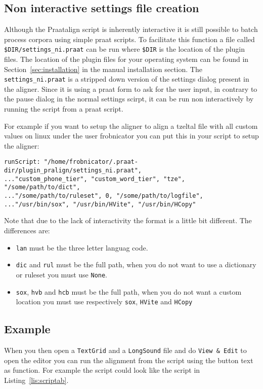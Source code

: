 \subsection{Non interactive settings file creation}
Although the Praatalign script is inherently interactive it is still possible
to batch process corpora using simple praat scripts. To facilitate this
function a file called \texttt{\$DIR/settings\_ni.praat} can be run where
\texttt{\$DIR} is the location of the plugin files. The location of the plugin
files for your operating system can be found in Section~\ref{sec:installation}
in the manual installation section. The \texttt{settings\_ni.praat} is a
stripped down version of the settings dialog present in the aligner. Since it
is using a praat form to ask for the user input, in contrary to the pause
dialog in the normal settings scirpt, it can be run non interactively by
running the script from a praat script.

For example if you want to setup the aligner to align a tzeltal file with all
custom values on linux under the user frobnicator you can put this in your
script to setup the aligner:

\begin{lstlisting}
runScript: "/home/frobnicator/.praat-dir/plugin_pralign/settings_ni.praat",
..."custom_phone_tier", "custom_word_tier", "tze", "/some/path/to/dict",
..."/some/path/to/ruleset", 0, "/some/path/to/logfile",
..."/usr/bin/sox", "/usr/bin/HVite", "/usr/bin/HCopy"
\end{lstlisting}

Note that due to the lack of interactivity the format is a little bit
different. The differences are:
\begin{itemize}
	\item \texttt{lan} must be the three letter languag code.
	\item \texttt{dic} and \texttt{rul} must be the full path, when you do not
want to use a dictionary or ruleset you must use \texttt{None}.
	\item \texttt{sox}, \texttt{hvb} and \texttt{hcb} must be the full path, when
you do not want a custom location you must use respectively \texttt{sox},
\texttt{HVite} and \texttt{HCopy}
\end{itemize}

\subsection{Example}
When you then open a \texttt{TextGrid} and a \texttt{LongSound} file and do
\texttt{View \& Edit} to open the editor you can run the alignment from the
script using the button text as function. For example the script could look
like the script in Listing~\ref{lis:scriptab}.

